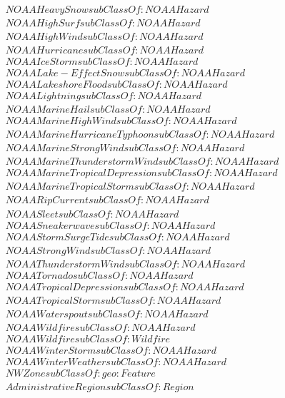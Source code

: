 \begin{align}
  NOAAHeavySnow subClassOf: NOAAHazard\\
  NOAAHighSurf subClassOf: NOAAHazard\\
  NOAAHighWind subClassOf: NOAAHazard\\
  NOAAHurricane subClassOf: NOAAHazard\\
  NOAAIceStorm subClassOf: NOAAHazard\\
  NOAALake-EffectSnow subClassOf: NOAAHazard\\
  NOAALakeshoreFlood subClassOf: NOAAHazard\\
  NOAALightning subClassOf: NOAAHazard\\
  NOAAMarineHail subClassOf: NOAAHazard\\
  NOAAMarineHighWind subClassOf: NOAAHazard\\
  NOAAMarineHurricaneTyphoon subClassOf: NOAAHazard\\
  NOAAMarineStrongWind subClassOf: NOAAHazard\\
  NOAAMarineThunderstormWind subClassOf: NOAAHazard\\
  NOAAMarineTropicalDepression subClassOf: NOAAHazard\\
  NOAAMarineTropicalStorm subClassOf: NOAAHazard\\
  NOAARipCurrent subClassOf: NOAAHazard\\
  NOAASleet subClassOf: NOAAHazard\\
  NOAASneakerwave subClassOf: NOAAHazard\\
  NOAAStormSurgeTide subClassOf: NOAAHazard\\
  NOAAStrongWind subClassOf: NOAAHazard\\
  NOAAThunderstormWind subClassOf: NOAAHazard\\
  NOAATornado subClassOf: NOAAHazard\\
  NOAATropicalDepression subClassOf: NOAAHazard\\
  NOAATropicalStorm subClassOf: NOAAHazard\\
  NOAAWaterspout subClassOf: NOAAHazard\\
  NOAAWildfire subClassOf: NOAAHazard\\
  NOAAWildfire subClassOf: Wildfire\\
  NOAAWinterStorm subClassOf: NOAAHazard\\
  NOAAWinterWeather subClassOf: NOAAHazard\\
  NWZone subClassOf: geo:Feature\\
  AdministrativeRegion subClassOf: Region\\

\end{align}
